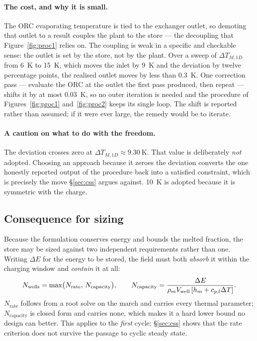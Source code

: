 \paragraph{The cost, and why it is small.}
The ORC evaporating temperature is tied to the exchanger outlet, so demoting
that outlet to a result couples the plant to the store --- the decoupling that
Figure~\ref{fig:proc1} relies on. The coupling is weak in a specific and
checkable sense: the outlet is set by the store, not by the plant. Over a sweep
of $\Delta T_{M,1D}$ from \SI{6}{\kelvin} to \SI{15}{\kelvin}, which moves the
inlet by \SI{9}{\kelvin} and the deviation by twelve percentage points, the
realised outlet moves by less than \SI{0.3}{\kelvin}. One correction pass ---
evaluate the ORC at the outlet the first pass produced, then repeat --- shifts
it by at most \SI{0.03}{\kelvin}, so no outer iteration is needed and the
procedure of Figures~\ref{fig:proc1} and~\ref{fig:proc2} keeps its single loop.
The shift is reported rather than assumed; if it were ever large, the remedy
would be to iterate.

\paragraph{A caution on what to do with the freedom.}
The deviation crosses zero at $\Delta T_{M,1D}\approx\SI{9.30}{\kelvin}$. That
value is deliberately \emph{not} adopted. Choosing an approach because it zeroes
the deviation converts the one honestly reported output of the procedure back
into a satisfied constraint, which is precisely the move \S\ref{sec:css} argues
against. \SI{10}{\kelvin} is adopted because it is symmetric with the charge.

\subsection{Consequence for sizing}

Because the formulation conserves energy and bounds the melted fraction, the
store may be sized against two independent requirements rather than one. Writing
$\Delta E$ for the energy to be stored, the field must both \emph{absorb} it
within the charging window and \emph{contain} it at all:
\begin{equation}
  N_{\mathrm{wells}} = \max\bigl(N_{\mathrm{rate}},\,N_{\mathrm{capacity}}\bigr),
  \qquad
  N_{\mathrm{capacity}} = \frac{\Delta E}
  {\rho_{m} V_{\mathrm{well}}\left[h_{m}+c_{p,l}\Delta T\right]}.
  \label{eq:sizing}
\end{equation}
$N_{\mathrm{rate}}$ follows from a root solve on the march and carries every
thermal parameter; $N_{\mathrm{capacity}}$ is closed form and carries none, which
makes it a hard lower bound no design can better. This applies to the
\emph{first} cycle; \S\ref{sec:css} shows that the rate criterion does not
survive the passage to cyclic steady state.

